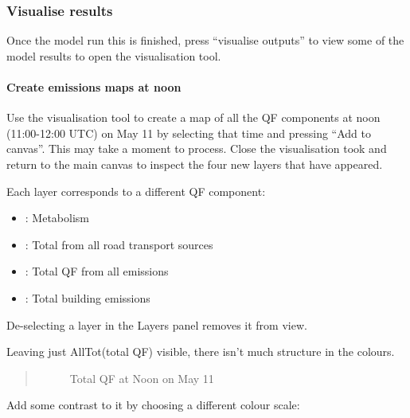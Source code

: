 \documentclass[letterpaper,10pt,english]{sphinxmanual}
\begin{document}
\subsubsection{Visualise results}
\label{\detokenize{Tutorials/GQF:visualise-results}}
Once the model run this is finished, press “visualise outputs” to view
some of the model results to open the visualisation tool.


\paragraph{Create emissions maps at noon}
\label{\detokenize{Tutorials/GQF:create-emissions-maps-at-noon}}
Use the visualisation tool to create a map of all the QF components at
noon (11:00-12:00 UTC) on May 11 by selecting that time and pressing
“Add to canvas”. This may take a moment to process. Close the
visualisation took and return to the main canvas to inspect the four new
layers that have appeared.

Each layer corresponds to a different QF component:
\begin{itemize}
\item {} 
: Metabolism

\item {} 
: Total from all road transport sources

\item {} 
: Total QF from all emissions

\item {} 
: Total building emissions

\end{itemize}

De-selecting a layer in the Layers panel removes it from view.

Leaving just AllTot(total QF) visible, there isn’t much structure in the
colours.
\begin{quote}

\begin{figure}[htbp]
\centering
\capstart

\noindent{}
\caption{Total QF at Noon on May 11}\label{\detokenize{Tutorials/GQF:id3}}\end{figure}
\end{quote}

Add some contrast to it by choosing a different colour scale:
\end{document}
